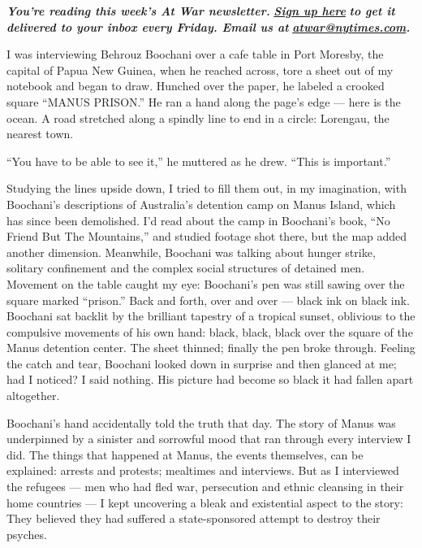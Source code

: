 \emph{\textbf{You're reading this week's At War newsletter.}}
\textbf{\href{https://www.nytimes.com/newsletters/at-war}{\emph{Sign up
here}}} \emph{\textbf{to get it delivered to your inbox every Friday.
Email us at}}
\textbf{\href{https://mail.google.com/mail/u/0/?view=cm\&fs=1\&tf=1\&source=mailto\&to=atwar@nytimes.com}{\emph{atwar@nytimes.com}}\emph{.}}

I was interviewing Behrouz Boochani over a cafe table in Port Moresby,
the capital of Papua New Guinea, when he reached across, tore a sheet
out of my notebook and began to draw. Hunched over the paper, he labeled
a crooked square ``MANUS PRISON.'' He ran a hand along the page's edge
--- here is the ocean. A road stretched along a spindly line to end in a
circle: Lorengau, the nearest town.

``You have to be able to see it,'' he muttered as he drew. ``This is
important.''

Studying the lines upside down, I tried to fill them out, in my
imagination, with Boochani's descriptions of Australia's detention camp
on Manus Island, which has since been demolished. I'd read about the
camp in Boochani's book, ``No Friend But The Mountains,'' and studied
footage shot there, but the map added another dimension. Meanwhile,
Boochani was talking about hunger strike, solitary confinement and the
complex social structures of detained men. Movement on the table caught
my eye: Boochani's pen was still sawing over the square marked
``prison.'' Back and forth, over and over --- black ink on black ink.
Boochani sat backlit by the brilliant tapestry of a tropical sunset,
oblivious to the compulsive movements of his own hand: black, black,
black over the square of the Manus detention center. The sheet thinned;
finally the pen broke through. Feeling the catch and tear, Boochani
looked down in surprise and then glanced at me; had I noticed? I said
nothing. His picture had become so black it had fallen apart altogether.

Boochani's hand accidentally told the truth that day. The story of Manus
was underpinned by a sinister and sorrowful mood that ran through every
interview I did. The things that happened at Manus, the events
themselves, can be explained: arrests and protests; mealtimes and
interviews. But as I interviewed the refugees --- men who had fled war,
persecution and ethnic cleansing in their home countries --- I kept
uncovering a bleak and existential aspect to the story: They believed
they had suffered a state-sponsored attempt to destroy their psyches.


